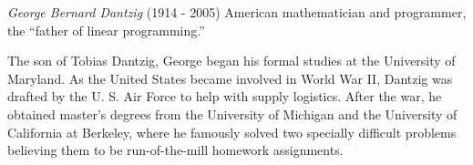 \documentclass[12pt]{article}
\begin{document}
\emph{George Bernard Dantzig} (1914 - 2005) American mathematician and programmer, the ``father of linear programming.''

The son of Tobias Dantzig, George began his formal studies at the University of Maryland. As the United States became involved in World War II, Dantzig was drafted by the U. S. Air Force to help with supply logistics. After the war, he obtained master's degrees from the University of Michigan and the University of California at Berkeley, where he famously solved two specially difficult problems believing them to be run-of-the-mill homework assignments.
\end{document}
